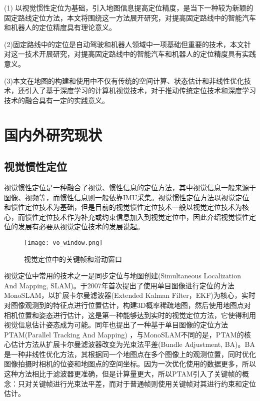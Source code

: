 (1) 以视觉惯性定位为基础，引入地图信息提高定位精度，是当下一种较为新颖的固定路线定位方法，本文将围绕这一方法展开研究，对提高固定路线中的智能汽车和机器人的定位精度具有理论意义。

(2)固定路线中的定位是自动驾驶和机器人领域中一项基础但重要的技术，本文针对这一技术开展研究，对提高固定路线中的智能汽车和机器人的定位精度具有实践意义。

(3)本文在地图的构建和使用中不仅有传统的空间计算、状态估计和非线性优化技术，还引入了基于深度学习的计算机视觉技术，对于推动传统定位技术和深度学习技术的融合具有一定的实践意义。


\section{国内外研究现状}
\subsection{视觉惯性定位}

视觉惯性定位是一种融合了视觉、惯性信息的定位方法，其中视觉信息一般来源于图像、视频等，而惯性信息则一般依靠IMU采集。视觉惯性定位方法以视觉定位和惯性定位技术为基础，但是目前的视觉惯性定位技术一般以视觉定位技术为核心，而惯性定位技术作为补充或约束信息加入到视觉定位中，因此介绍视觉惯性定位的发展有必要从视觉定位技术的发展说起。


\begin{figure}
  \centering
  \texttt{[image: vo\_window.png]}
  \caption{视觉定位中的关键帧和滑动窗口}
  \label{fig:vo_window}
\end{figure}

视觉定位中常用的技术之一是同步定位与地图创建(Simultaneous Localization And Mapping, SLAM)。\citet{davison2007monoslam}于2007年首次提出了使用单目图像进行定位的方法MonoSLAM，以扩展卡尔曼滤波器(Extended Kalman Filter，EKF)为核心，实时对图像观测到的特征点进行位置估计，构建3D概率稀疏地图，然后使用地图点对相机位置和姿态进行估计，这是第一种能够达到实时的视觉定位方法，它使得利用视觉信息估计姿态成为可能。同年\citet{klein2007parallel}也提出了一种基于单目图像的定位方法PTAM(Parallel Tracking And Mapping) ，与MonoSLAM不同的是，PTAM的核心估计方法从扩展卡尔曼滤波器改变为光束法平差(Bundle Adjustment, BA)\cite{triggs2000bundle}。BA是一种非线性优化方法，其根据同一个地图点在多个图像上的观测位置，同时优化图像拍摄时相机的位姿和地图点的空间坐标。因为一次优化使用的数据更多，所以这种方法相比于滤波器更准确，但是计算量更大，所以PTAM引入了关键帧的概念：只对关键帧进行光束法平差，而对于普通帧则使用关键帧对其进行约束和定位估计。


